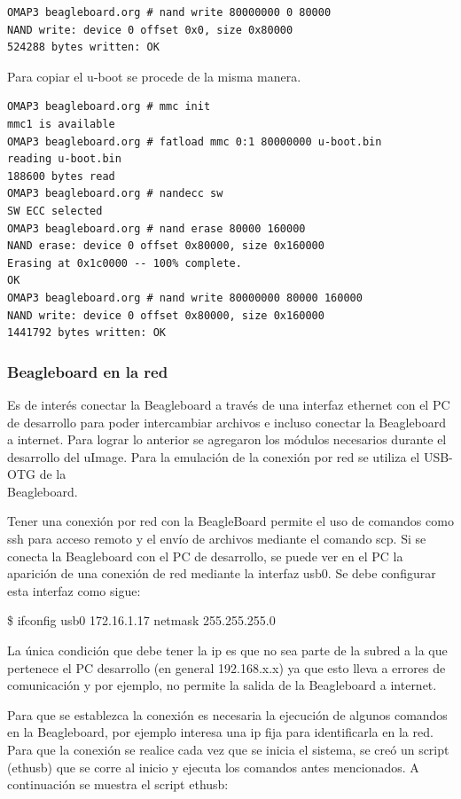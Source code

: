 \begin{verbatim}
OMAP3 beagleboard.org # nand write 80000000 0 80000 
NAND write: device 0 offset 0x0, size 0x80000 
524288 bytes written: OK 
\end{verbatim}

Para copiar el u-boot se procede de la misma manera.

\begin{verbatim}
OMAP3 beagleboard.org # mmc init 
mmc1 is available 
OMAP3 beagleboard.org # fatload mmc 0:1 80000000 u-boot.bin 
reading u-boot.bin 
188600 bytes read 
OMAP3 beagleboard.org # nandecc sw 
SW ECC selected 
OMAP3 beagleboard.org # nand erase 80000 160000 
NAND erase: device 0 offset 0x80000, size 0x160000 
Erasing at 0x1c0000 -- 100% complete. 
OK 
OMAP3 beagleboard.org # nand write 80000000 80000 160000 
NAND write: device 0 offset 0x80000, size 0x160000 
1441792 bytes written: OK
\end{verbatim}

\subsubsection{Beagleboard en la red}

Es de interés conectar la Beagleboard a través de una interfaz ethernet con el PC de desarrollo para poder intercambiar archivos e incluso conectar la Beagleboard a internet. Para lograr lo anterior se agregaron los módulos necesarios durante el desarrollo del uImage. Para la emulación de la conexión por red se utiliza el USB-OTG de la \\
Beagleboard.

\bigskip
{}

\bigskip
Tener una conexión por red con la BeagleBoard permite el uso de comandos como ssh para acceso remoto y el envío de archivos mediante el comando scp. 
Si se conecta la Beagleboard con el PC de desarrollo, se puede ver en el PC la aparición de una conexión de red mediante la interfaz usb0. Se debe configurar esta interfaz como sigue:

\bigskip
\centerline{\$ ifconfig usb0 172.16.1.17 netmask 255.255.255.0}

\bigskip
La única condición que debe tener la ip es que no sea parte de la subred a la que pertenece el PC desarrollo (en general 192.168.x.x) ya que esto lleva a errores de comunicación y por ejemplo, no permite la salida de la Beagleboard a internet.

\bigskip
Para que se establezca la conexión es necesaria la ejecución de algunos comandos en la Beagleboard, por ejemplo interesa una ip fija para identificarla en la red. Para que la conexión se realice cada vez que se inicia el sistema, se creó un script (ethusb) que se corre al inicio y ejecuta los comandos antes mencionados.
A continuación se muestra el script ethusb:

